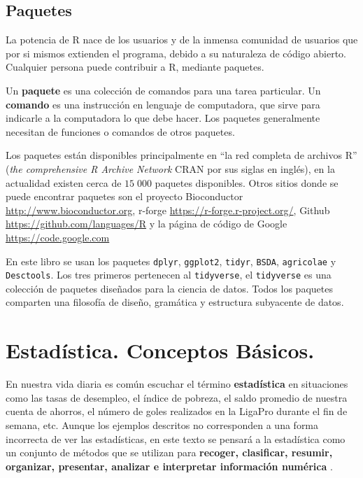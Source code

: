 \documentclass[letterpaper,]{book}
\begin{document}
\hypertarget{packages}{%
\section{Paquetes}\label{packages}}

La potencia de R nace de los usuarios y de la inmensa comunidad de usuarios que por si mismos extienden el programa, debido a su naturaleza de código abierto. Cualquier persona puede contribuir a R, mediante paquetes.

Un \textbf{paquete} es una colección de comandos para una tarea particular. Un \textbf{comando} es una instrucción en lenguaje de computadora, que sirve para indicarle a la computadora lo que debe hacer. Los paquetes generalmente necesitan de funciones o comandos de otros paquetes.

Los paquetes están disponibles principalmente en ``la red completa de archivos R'' (\emph{the comprehensive R Archive Network} CRAN por sus siglas en inglés), en la actualidad existen cerca de \(15\;000\) paquetes disponibles. Otros sitios donde se puede encontrar paquetes son el proyecto Bioconductor \url{http://www.bioconductor.org}, r-forge \url{https://r-forge.r-project.org/}, Github \url{https://github.com/languages/R} y la página de código de Google \url{https://code.google.com}

En este libro se usan los paquetes \texttt{dplyr}, \texttt{ggplot2}, \texttt{tidyr}, \texttt{BSDA}, \texttt{agricolae} y \texttt{Desctools}. Los tres primeros pertenecen al \texttt{tidyverse}, el \texttt{tidyverse} es una colección de paquetes diseñados para la ciencia de datos. Todos los paquetes comparten una filosofía de diseño, gramática y estructura subyacente de datos.

\hypertarget{intro}{%
\chapter{Estadística. Conceptos Básicos.}\label{intro}}

En nuestra vida diaria es común escuchar el término \textbf{estadística} en situaciones como las tasas de desempleo, el índice de pobreza, el saldo promedio de nuestra cuenta de ahorros, el número de goles realizados en la LigaPro durante el fin de semana, etc. Aunque los ejemplos descritos no corresponden a una forma incorrecta de ver las estadísticas, en este texto se pensará
a la estadística como un conjunto de métodos que se utilizan para \textbf{recoger, clasificar, resumir, organizar, presentar, analizar e interpretar información numérica} \citep{cleff2013}.
\end{document}
